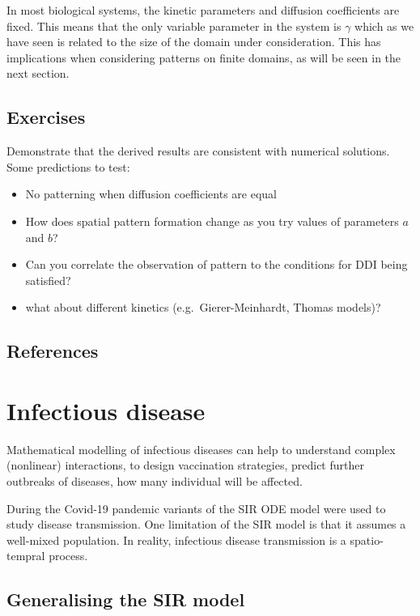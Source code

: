 \documentclass[
  letterpaper,
  DIV=11,
  numbers=noendperiod]{scrreprt}
\providecommand{\tightlist}{%
  \setlength{\itemsep}{0pt}\setlength{\parskip}{0pt}}\usepackage{longtable,booktabs,array}
\theoremstyle{plain}
\theoremstyle{definition}
\theoremstyle{plain}
\theoremstyle{remark}
\begin{document}
In most biological systems, the kinetic parameters and diffusion
coefficients are fixed. This means that the only variable parameter in
the system is \(\gamma\) which as we have seen is related to the size of
the domain under consideration. This has implications when considering
patterns on finite domains, as will be seen in the next section.

\hypertarget{exercises}{%
\section{Exercises}\label{exercises}}

Demonstrate that the derived results are consistent with numerical
solutions. Some predictions to test:

\begin{itemize}
\tightlist
\item
  No patterning when diffusion coefficients are equal
\item
  How does spatial pattern formation change as you try values of
  parameters \(a\) and \(b\)?
\item
  Can you correlate the observation of pattern to the conditions for DDI
  being satisfied?
\item
  what about different kinetics (e.g.~Gierer-Meinhardt, Thomas models)?
\end{itemize}

\hypertarget{references-2}{%
\section{References}\label{references-2}}

\hypertarget{infectious-disease}{%
\chapter{Infectious disease}\label{infectious-disease}}

Mathematical modelling of infectious diseases can help to understand
complex (nonlinear) interactions, to design vaccination strategies,
predict further outbreaks of diseases, how many individual will be
affected.

During the Covid-19 pandemic variants of the SIR ODE model were used to
study disease transmission. One limitation of the SIR model is that it
assumes a well-mixed population. In reality, infectious disease
transmission is a spatio-tempral process.

\hypertarget{generalising-the-sir-model}{%
\section{Generalising the SIR model}\label{generalising-the-sir-model}}
\end{document}
